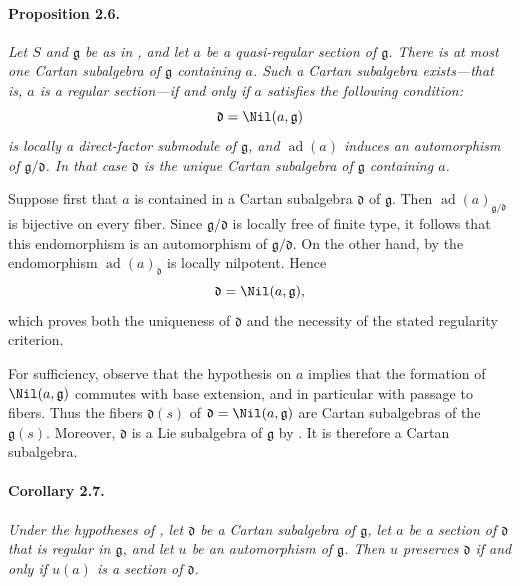 \paragraph{\textbf{Proposition 2.6.}}
\emph{Let \(S\) and \(\mathfrak g\) be as in , and let \(a\) be a
quasi-regular section of \(\mathfrak g\). There is at most one Cartan
subalgebra of \(\mathfrak g\) containing \(a\). Such a Cartan
subalgebra exists---that is, \(a\) is a regular section---if and only
if \(a\) satisfies the following condition:
\[
  \mathfrak d=\Nil(a,\mathfrak g)
\]
is locally a direct-factor submodule of \(\mathfrak g\), and
\(\operatorname{ad}(a)\) induces an automorphism of
\(\mathfrak g/\mathfrak d\). In that case \(\mathfrak d\) is the
unique Cartan subalgebra of \(\mathfrak g\) containing \(a\).}

Suppose first that \(a\) is contained in a Cartan subalgebra
\(\mathfrak d\) of \(\mathfrak g\). Then
\(\operatorname{ad}(a)_{\mathfrak g/\mathfrak d}\) is bijective on
every fiber. Since \(\mathfrak g/\mathfrak d\) is locally free of
finite type, it follows that this endomorphism is an automorphism of
\(\mathfrak g/\mathfrak d\). On the other hand, by  the
endomorphism \(\operatorname{ad}(a)_{\mathfrak d}\) is locally
nilpotent. Hence
\[
  \mathfrak d=\Nil(a,\mathfrak g),
\]
which proves both the uniqueness of \(\mathfrak d\) and the
necessity of the stated regularity criterion.

For sufficiency, observe that the hypothesis on \(a\) implies that
the formation of \(\Nil(a,\mathfrak g)\) commutes with base
extension, and in particular with passage to fibers. Thus the fibers
\(\mathfrak d(s)\) of
\(\mathfrak d=\Nil(a,\mathfrak g)\) are Cartan subalgebras of the
\(\mathfrak g(s)\). Moreover, \(\mathfrak d\) is a Lie subalgebra of
\(\mathfrak g\) by . It is therefore a Cartan subalgebra.

\paragraph{\textbf{Corollary 2.7.}}
\emph{Under the hypotheses of , let \(\mathfrak d\) be a Cartan
subalgebra of \(\mathfrak g\), let \(a\) be a section of
\(\mathfrak d\) that is regular in \(\mathfrak g\), and let \(u\) be
an automorphism of \(\mathfrak g\). Then \(u\) preserves
\(\mathfrak d\) if and only if \(u(a)\) is a section of
\(\mathfrak d\).}

